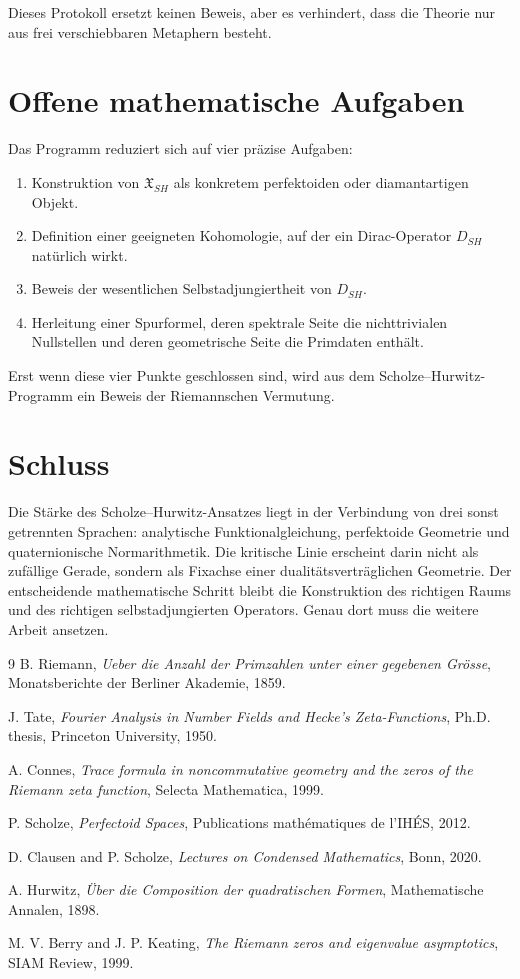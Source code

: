 \documentclass[11pt,a4paper,reqno]{amsart}
\theoremstyle{definition}
\numberwithin{equation}{section}
\begin{document}
Dieses Protokoll ersetzt keinen Beweis, aber es verhindert, dass die Theorie nur aus frei verschiebbaren Metaphern besteht.

\section{Offene mathematische Aufgaben}

Das Programm reduziert sich auf vier präzise Aufgaben:
\begin{enumerate}
  \item Konstruktion von \(\mathfrak{X}_{SH}\) als konkretem perfektoiden oder diamantartigen Objekt.
  \item Definition einer geeigneten Kohomologie, auf der ein Dirac-Operator \(D_{SH}\) natürlich wirkt.
  \item Beweis der wesentlichen Selbstadjungiertheit von \(D_{SH}\).
  \item Herleitung einer Spurformel, deren spektrale Seite die nichttrivialen Nullstellen und deren geometrische Seite die Primdaten enthält.
\end{enumerate}

Erst wenn diese vier Punkte geschlossen sind, wird aus dem Scholze--Hurwitz-Programm ein Beweis der Riemannschen Vermutung.

\section{Schluss}

Die Stärke des Scholze--Hurwitz-Ansatzes liegt in der Verbindung von drei sonst getrennten Sprachen: analytische Funktionalgleichung, perfektoide Geometrie und quaternionische Normarithmetik. Die kritische Linie erscheint darin nicht als zufällige Gerade, sondern als Fixachse einer dualitätsverträglichen Geometrie. Der entscheidende mathematische Schritt bleibt die Konstruktion des richtigen Raums und des richtigen selbstadjungierten Operators. Genau dort muss die weitere Arbeit ansetzen.

\begin{thebibliography}{9}
B. Riemann,
\emph{Ueber die Anzahl der Primzahlen unter einer gegebenen Grösse},
Monatsberichte der Berliner Akademie, 1859.

J. Tate,
\emph{Fourier Analysis in Number Fields and Hecke's Zeta-Functions},
Ph.D. thesis, Princeton University, 1950.

A. Connes,
\emph{Trace formula in noncommutative geometry and the zeros of the Riemann zeta function},
Selecta Mathematica, 1999.

P. Scholze,
\emph{Perfectoid Spaces},
Publications mathématiques de l'IHÉS, 2012.

D. Clausen and P. Scholze,
\emph{Lectures on Condensed Mathematics},
Bonn, 2020.

A. Hurwitz,
\emph{Über die Composition der quadratischen Formen},
Mathematische Annalen, 1898.

M. V. Berry and J. P. Keating,
\emph{The Riemann zeros and eigenvalue asymptotics},
SIAM Review, 1999.
\end{thebibliography}
\end{document}
